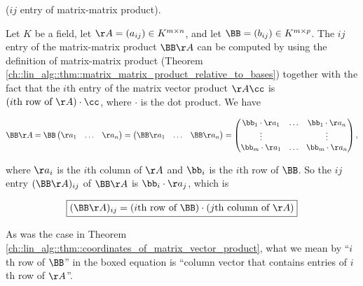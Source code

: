 \begin{theorem}
\label{ch::lin_alg::thm::coordinates_of_matrix_matrix_product}

    ($ij$ entry of matrix-matrix product). 
    
    Let $K$ be a field, let $\AA = (a_{ij}) \in K^{m \times n}$, and let $\BB = (b_{ij}) \in K^{m \times p}$. The $ij$ entry of the matrix-matrix product $\BB \AA$ can be computed by using the definition of matrix-matrix product (Theorem \ref{ch::lin_alg::thm::matrix_matrix_product_relative_to_bases}) together with the fact that the $i$th entry of the matrix vector product $\AA \cc$ is $(\text{$i$th row of $\AA$}) \cdot \cc$, where $\cdot$ is the dot product. We have
    
    \begin{align*}
        \BB \AA
        = 
        \BB
        \begin{pmatrix}
            \aa_1 & \hdots & \aa_n
        \end{pmatrix}
        =
        \begin{pmatrix}
            \BB \aa_1 & \hdots & \BB \aa_n
        \end{pmatrix}
        =
        \begin{pmatrix}
            \bb_1 \cdot \aa_1 & \hdots & \bb_1 \cdot \aa_n \\
            \vdots & & \vdots \\
            \bb_m \cdot \aa_1 & \hdots & \bb_m \cdot \aa_n
        \end{pmatrix},
    \end{align*}
    
    where $\aa_i$ is the $i$th column of $\AA$ and $\bb_i$ is the $i$th row of $\BB$. So the $ij$ entry $(\BB \AA)_{ij}$ of $\BB \AA$ is $\bb_i \cdot \aa_j$, which is
    
    \begin{align*}
        \boxed
        {
            (\BB \AA)_{ij} = (\text{$i$th row of $\BB$}) \cdot (\text{$j$th column of $\AA$})
        }
    \end{align*}
    
    As was the case in Theorem \ref{ch::lin_alg::thm::coordinates_of_matrix_vector_product}, what we mean by ``$i$th row of $\BB$'' in the boxed equation is ``column vector that contains entries of $i$th row of $\AA$''.
\end{theorem}

